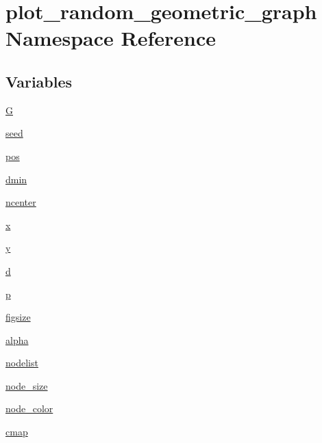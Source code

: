 \hypertarget{namespaceplot__random__geometric__graph}{}\section{plot\+\_\+random\+\_\+geometric\+\_\+graph Namespace Reference}
\label{namespaceplot__random__geometric__graph}
\subsection*{Variables}
\begin{DoxyCompactItemize}
\item 
\hyperlink{namespaceplot__random__geometric__graph_ac48a6fa4bfcff40f39e2aad881c035fe}{G}
\item 
\hyperlink{namespaceplot__random__geometric__graph_a04de05f219119ba9786961bf93329475}{seed}
\item 
\hyperlink{namespaceplot__random__geometric__graph_a74f11e34ad336826fede38446ec1342f}{pos}
\item 
\hyperlink{namespaceplot__random__geometric__graph_aa502670f1a6cb532c6976dc4411414ad}{dmin}
\item 
\hyperlink{namespaceplot__random__geometric__graph_abf2d0a948cb3d31657c2550ea8d7d580}{ncenter}
\item 
\hyperlink{namespaceplot__random__geometric__graph_a2d5fc0aecf7ac9fd35ea3e93ff0df8f3}{x}
\item 
\hyperlink{namespaceplot__random__geometric__graph_a2079c62bc0fde5ed1e2c23397b07f200}{y}
\item 
\hyperlink{namespaceplot__random__geometric__graph_a3278b958c5da583f9ef87949560aee3d}{d}
\item 
\hyperlink{namespaceplot__random__geometric__graph_aadd2a6a3d422bddf479e072db696b9ba}{p}
\item 
\hyperlink{namespaceplot__random__geometric__graph_a793e8bbb939486fde9582b80191dd6e6}{figsize}
\item 
\hyperlink{namespaceplot__random__geometric__graph_a5d4fd41216a2696cc2a269ae8f3167e2}{alpha}
\item 
\hyperlink{namespaceplot__random__geometric__graph_afbcc1e67cb26e59864bfe1bab2533e1f}{nodelist}
\item 
\hyperlink{namespaceplot__random__geometric__graph_a138004772e93a53186e32192341a7d68}{node\+\_\+size}
\item 
\hyperlink{namespaceplot__random__geometric__graph_a510d659aedb82777e1a5472a5e213cb6}{node\+\_\+color}
\item 
\hyperlink{namespaceplot__random__geometric__graph_aecef19a3c16ec767e19cd74f80b0cee7}{cmap}
\end{DoxyCompactItemize}


